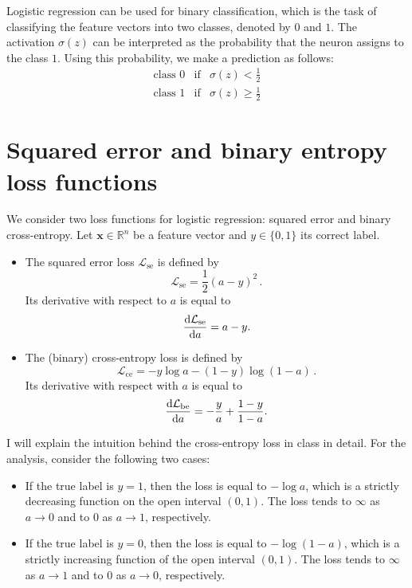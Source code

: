\documentclass[12pt]{article}
\newcommand{\R}{\mathbb{R}}
\newcommand{\x}{\boldsymbol{x}}
\begin{document}
Logistic regression can be used for binary classification, which is the task of classifying the feature vectors into two classes, denoted by $0$ and $1$.
The activation $\sigma(z)$ can be interpreted as the probability that the neuron assigns to the class $1$. Using this probability, we make a prediction as follows:
\begin{eqnarray}
\mbox{class $0$} & \mbox{if} & \sigma(z) < \frac{1}{2} \\
\mbox{class $1$} & \mbox{if} & \sigma(z) \ge \frac{1}{2}
\end{eqnarray}

\section{Squared error and binary entropy loss functions}

We consider two loss functions for logistic regression: squared error and binary cross-entropy. 
Let $\x\in\R^n$ be a feature vector and $y\in\{0,1\}$ its correct label.

\begin{itemize}
\item The squared error loss $\mathcal{L}_\mathrm{se}$ is defined by
\begin{equation}
\mathcal{L}_\mathrm{se} = \frac{1}{2} (a - y)^2\,.
\end{equation}
Its derivative with respect to $a$ is equal to 
\begin{equation}
{\mathrm{d} \mathcal{L}_\mathrm{se} \over \mathrm{d} a} = a - y.
\end{equation}
%
%
%
\item The (binary) cross-entropy loss is defined by
\begin{equation}
\mathcal{L}_\mathrm{ce} = - y \log a - (1-y) \log(1-a)\,.
\end{equation}
Its derivative with respect with $a$ is equal to 
\begin{equation}
{\mathrm{d} \mathcal{L}_\mathrm{be} \over \mathrm{d} a} = -\frac{y}{a} + \frac{1-y}{1-a}.
\end{equation}
\end{itemize}

I will explain the intuition behind the cross-entropy loss in class in detail. For the analysis, consider the following two cases:
\begin{itemize}
\item If the true label is $y=1$, then the loss is equal to $-\log a$, which is a strictly decreasing function on the open interval $(0,1)$.  The loss tends to $\infty$ as $a\rightarrow 0$ and to $0$ as $a\rightarrow 1$, respectively.
\item If the true label is $y=0$, then the loss is equal to $-\log(1-a)$, which is a strictly increasing function of the open interval $(0,1)$.  The loss tends to $\infty$ as $a\rightarrow 1$ and to $0$ as $a\rightarrow 0$, respectively.
\end{itemize}
\end{document}
